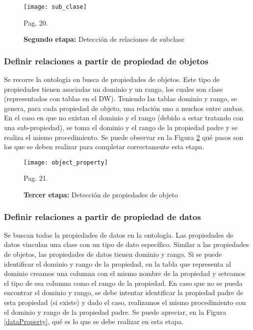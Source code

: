 \documentclass[a4paper,11pt]{article}
\begin{document}
\begin{flushleft}
    \begin{figure}[!htb]
      \begin{center}
        \texttt{[image: sub\_clase]}
        \caption{\textbf{Segundo etapa:} Detección de relaciones de subclase} \cite{ontologias} Pag. 20.
        \label{subClase}
      \end{center}
    \end{figure}
     
     
    \subsubsection{Definir relaciones a partir de propiedad de objetos}
    
    Se recorre la ontología en busca de propiedades de objetos. Este tipo de propiedades tienen asociadas un dominio y un rango, los cuales son clase
    (representados con tablas en el DW). Teniendo las tablas dominio y rango, se genera, para cada propiedad de objeto, una relación uno a muchos entre ambas. En
    el caso en que no existan el dominio y el rango (debido a estar tratando con una sub-propiedad), se toma el dominio y el rango de la propiedad padre y se
    realiza el mismo procedimiento. Se puede observar en la Figura \ref{objectProperty} qué pasos son los que se deben realizar para completar correctamente esta
    etapa.
    
    \begin{figure}[!htb]
      \begin{center}
        \texttt{[image: object\_property]}
        \caption{\textbf{Tercer etapa:} Detección de propiedades de objeto} \cite{ontologias} Pag. 21.
        \label{objectProperty}
      \end{center}
    \end{figure}
    
    
    \subsubsection{Definir relaciones a partir de propiedad de datos}
    
    Se buscan todas la propiedades de datos en la ontología. Las propiedades de datos vinculan una clase con un tipo de dato específico. Similar a las propiedades
    de objetos, las propiedades de datos tienen dominio y rango. Si se puede identificar el dominio y rango de la propiedad, en la tabla que representa al dominio
    creamos una columna con el mismo nombre de la propiedad y seteamos el tipo de esa columna como el rango de la propiedad. En caso que no se pueda encontrar el
    dominio y rango, se debe intentar identificar la propiedad padre de esta propiedad (si existe) y dado el caso, realizamos el mismo procedimiento con el
    dominio y rango de la propiedad padre. Se puede apreciar, en la Figura \ref{dataProperty}, qué es lo que se debe realizar en esta etapa.
    

\end{flushleft}
\end{document}
